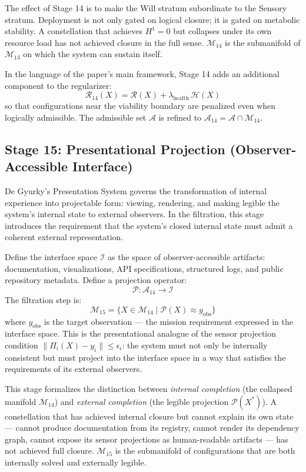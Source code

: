 \documentclass[11pt, oneside]{article}
\begin{document}
The effect of Stage 14 is to make the Will stratum subordinate to the Sensory stratum.
Deployment is not only gated on logical closure; it is gated on metabolic stability.
A constellation that achieves $H^1 = 0$ but collapses under its own resource load has
not achieved closure in the full sense. $\mathcal{M}_{14}$ is the submanifold of
$\mathcal{M}_{13}$ on which the system can sustain itself.

In the language of the paper's main framework, Stage 14 adds an additional component to
the regularizer:
\[
\mathcal{R}_{14}(X) = \mathcal{R}(X) + \lambda_{\mathrm{health}}\,\mathcal{H}(X)
\]
so that configurations near the viability boundary are penalized even when logically
admissible. The admissible set $\mathcal{A}$ is refined to $\mathcal{A}_{14} = \mathcal{A}
\cap \mathcal{M}_{14}$.

\subsection{Stage 15: Presentational Projection (Observer-Accessible Interface)}

De Gyurky's Presentation System governs the transformation of internal experience into
projectable form: viewing, rendering, and making legible the system's internal state to
external observers. In the filtration, this stage introduces the requirement that the
system's closed internal state must admit a coherent external representation.

Define the interface space $\mathcal{I}$ as the space of observer-accessible artifacts:
documentation, visualizations, API specifications, structured logs, and public repository
metadata. Define a projection operator:
\[
\mathcal{P} : \mathcal{A}_{14} \to \mathcal{I}
\]
The filtration step is:
\[
\mathcal{M}_{15} = \{ X \in \mathcal{M}_{14} \mid \mathcal{P}(X) \approx y_{\mathrm{obs}} \}
\]
where $y_{\mathrm{obs}}$ is the target observation --- the mission requirement expressed
in the interface space. This is the presentational analogue of the sensor projection
condition $\|\Pi_i(X) - y_i\| \le \epsilon_i$: the system must not only be internally
consistent but must project into the interface space in a way that satisfies the
requirements of its external observers.

This stage formalizes the distinction between \emph{internal completion} (the collapsed
manifold $\mathcal{M}_{14}$) and \emph{external completion} (the legible projection
$\mathcal{P}(X^*)$). A constellation that has achieved internal closure but cannot
explain its own state --- cannot produce documentation from its registry, cannot render
its dependency graph, cannot expose its sensor projections as human-readable artifacts ---
has not achieved full closure. $\mathcal{M}_{15}$ is the submanifold of configurations
that are both internally solved and externally legible.
\end{document}
